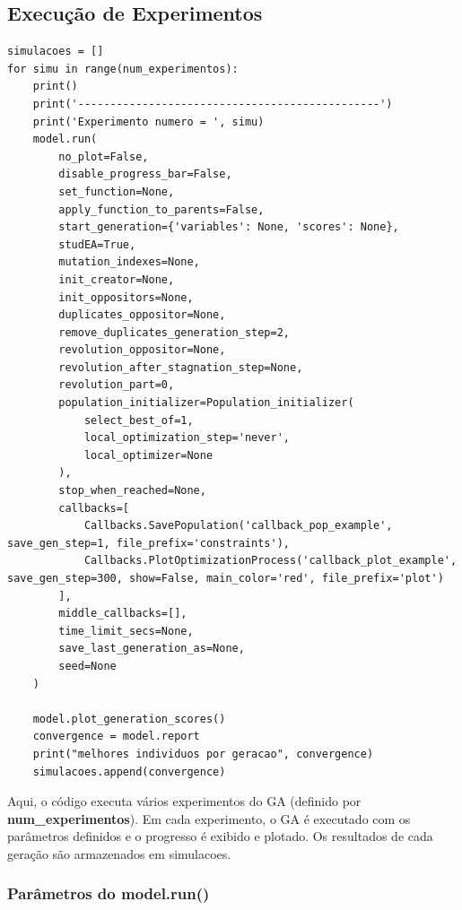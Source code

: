 \documentclass[a4paper, 12pt]{article}
\begin{document}
\subsection{Execução de Experimentos}

\begin{lstlisting}[style=python]
simulacoes = []
for simu in range(num_experimentos):
    print()
    print('-----------------------------------------------')
    print('Experimento numero = ', simu)
    model.run(
        no_plot=False,
        disable_progress_bar=False,
        set_function=None,
        apply_function_to_parents=False,
        start_generation={'variables': None, 'scores': None},
        studEA=True,
        mutation_indexes=None,
        init_creator=None,
        init_oppositors=None,
        duplicates_oppositor=None,
        remove_duplicates_generation_step=2,
        revolution_oppositor=None,
        revolution_after_stagnation_step=None,
        revolution_part=0,
        population_initializer=Population_initializer(
            select_best_of=1,
            local_optimization_step='never',
            local_optimizer=None
        ),
        stop_when_reached=None,
        callbacks=[
            Callbacks.SavePopulation('callback_pop_example', save_gen_step=1, file_prefix='constraints'),
            Callbacks.PlotOptimizationProcess('callback_plot_example', save_gen_step=300, show=False, main_color='red', file_prefix='plot')
        ],
        middle_callbacks=[],
        time_limit_secs=None,
        save_last_generation_as=None,
        seed=None
    )

    model.plot_generation_scores()
    convergence = model.report
    print("melhores individuos por geracao", convergence)
    simulacoes.append(convergence)
\end{lstlisting}

Aqui, o código executa vários experimentos do GA (definido por \textbf{num\_experimentos}). Em cada experimento, o GA é executado com os parâmetros definidos e o progresso é exibido e plotado. Os resultados de cada geração são armazenados em simulacoes. \\

\subsubsection{Parâmetros do model.run()} 
\end{document}
